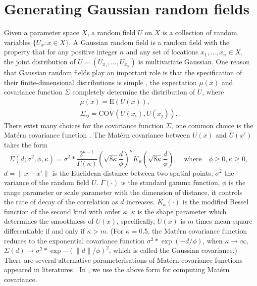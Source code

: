 \documentclass[article,nojss]{jss}\usepackage[]{graphicx}\usepackage[]{color}
\def\cov{{\text{COV}}}
\def\E{{\text{E}}}
\begin{document}
\section{Generating Gaussian random fields} 
Given a parameter space $X$, a random field $U$ on $X$ is a collection of random variables $\{U_x :x\in X\}$. A Gaussian random field is a random field with the property that for any positive integer $n$ and any set of locations $x_1,\dots,x_n \in X$, the joint distribution of $U=(U_{x_1},\dots,U_{x_n})$ is multivariate Gaussian. One reason that Gaussian random fields play an important role is that the specification of their finite-dimensional distributions is simple \citep{abrahamsen1997review}, the expectation $\mu(x)$ and covariance function $\Sigma$ completely determine the distribution of $U$, where 
\begin{gather*} 
\mu(x) = \E (U(x)),\\
\Sigma_{ij} = \cov (U(x_i),U(x_j)).
\end{gather*}
There exist many choices for the covariance function $\Sigma$, one common choice is the Mat\'ern covariance function \citep{matern1960spatial}. The Mat\'ern covariance between $U(x)$ and $U(x')$ takes the form 
\begin{equation*}
\Sigma(d;\sigma^2,\phi,\kappa)=\sigma^2*\frac{2^{\kappa-1}}{\Gamma(\kappa)} (\sqrt{8\kappa} \frac{d}{\phi})^\kappa  K_\kappa(\sqrt{8\kappa}  \frac{d}{\phi}),  \quad \text{where} \quad \phi 	\geq 0,  \kappa 	\geq 0,
\end{equation*} 
$d =\|x-x'\|$ is the Euclidean distance between two spatial points, 
$\sigma^2$ the variance of the random field $U$.
$\Gamma(\cdot)$ is the standard gamma function,  $\phi$ is the range parameter or scale parameter with the dimension of distance, it controls the rate of decay of the correlation as $d$ increases. $K_\kappa(\cdot)$ is the modified Bessel function of the second kind with order $\kappa$, $\kappa$ is the shape parameter which determines the smoothness of $U(x)$, specifically, $U(x)$ is $m$ times mean-square differentiable if and only if $\kappa > m$. (For $\kappa=0.5$, the Mat\'ern covariance function reduces to the exponential covariance function $\sigma^2*\exp(-d/\phi)$, when $\kappa \rightarrow \infty$, $\Sigma(d) \rightarrow \sigma^2*\exp{-(\|d\|/\phi)^2}$, which is called the Gaussian covariance.)  There are several alternative parameterisations of Mat\'ern covariance functions appeared in literatures  \citep[see][]{haskard2007anisotropic}. In , we use the above form for computing Mat\'ern covariance.
\end{document}
